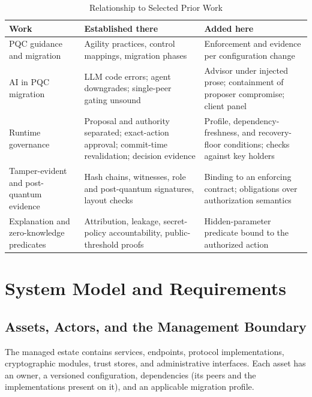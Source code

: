 \documentclass[journal]{IEEEtran}
\begin{document}
\begin{table}[t]
\caption{Relationship to Selected Prior Work}
\label{tab:related}
\centering
\footnotesize
\setlength{\tabcolsep}{3pt}
\begin{tabular}{>{\raggedright\arraybackslash}p{2.55cm}>{\raggedright\arraybackslash}p{2.6cm}>{\raggedright\arraybackslash}p{2.75cm}}
\toprule
Work & Established there & Added here \\
\midrule
PQC guidance and migration~\cite{cswp39,cswp48,naether,meta} & Agility practices, control mappings, migration phases & Enforcement and evidence per configuration change \\
\addlinespace[2pt]
AI in PQC migration~\cite{kimpqc,han} & LLM code errors; agent downgrades; single-peer gating unsound & Advisor under injected prose; containment of proposer compromise; client panel \\
\addlinespace[2pt]
Runtime governance~\cite{aegis,mazz2,beshane,aidguard,airep} & Proposal and authority separated; exact-action approval; commit-time revalidation; decision evidence & Profile, dependency-freshness, and recovery-floor conditions; checks against key holders \\
\addlinespace[2pt]
Tamper-evident and post-quantum evidence~\cite{schneier,crosby,ct,intoto,kao,asqav} & Hash chains, witnesses, role and post-quantum signatures, layout checks & Binding to an enforcing contract; obligations over authorization semantics \\
\addlinespace[2pt]
Explanation and zero-knowledge predicates~\cite{shap,lime,shokri,kroll,gopalakrishna} & Attribution, leakage, secret-policy accountability, public-threshold proofs & Hidden-parameter predicate bound to the authorized action \\
\bottomrule
\end{tabular}
\end{table}

\section{System Model and Requirements}
\label{sec:model}

\subsection{Assets, Actors, and the Management Boundary}
The managed estate contains services, endpoints, protocol implementations, cryptographic modules, trust stores, and administrative interfaces. Each asset has an owner, a versioned configuration, dependencies (its peers and the implementations present on it), and an applicable migration profile.
\end{document}
